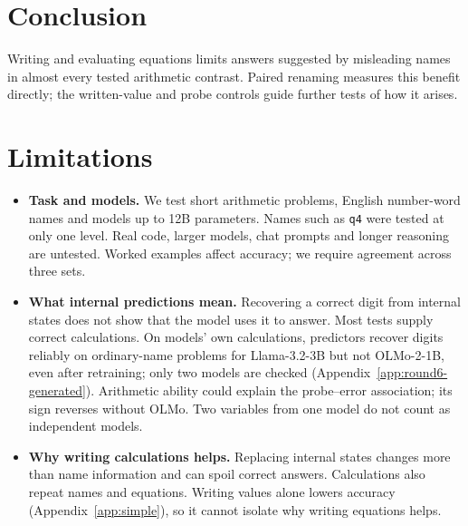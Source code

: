 \documentclass[11pt]{article}
\begin{document}
\section{Conclusion}

Writing and evaluating equations limits answers suggested by misleading names in almost
every tested arithmetic contrast. Paired renaming measures this benefit directly;
the written-value and probe controls guide further tests of how it arises.

\section*{Limitations}

\begin{itemize}
\item \textbf{Task and models.} We test short arithmetic problems, English number-word names and
models up to 12B parameters. Names such as \texttt{q4} were tested at only one level. Real code,
larger models, chat prompts and longer reasoning are untested. Worked examples affect
accuracy; we require agreement across three sets.
\item \textbf{What internal predictions mean.} Recovering a correct digit from internal
states does not show that the model uses it to answer. Most tests supply correct
calculations. On models' own calculations, predictors recover digits reliably on
ordinary-name problems for Llama-3.2-3B but not OLMo-2-1B, even after retraining;
only two models are checked (Appendix~\ref{app:round6-generated}). Arithmetic ability could
explain the probe--error association; its sign reverses without OLMo. Two variables from
one model do not count as independent models.
\item \textbf{Why writing calculations helps.} Replacing internal states changes more than
name information and can spoil correct answers. Calculations also repeat names and
equations. Writing values alone lowers accuracy (Appendix~\ref{app:simple}), so it
cannot isolate why writing equations helps.
\end{itemize}



\appendix
\clearpage

\end{document}
